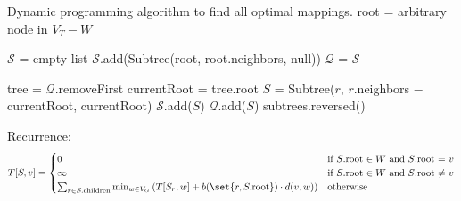 \documentclass[language=english, number=1]{../lib/homework}
\begin{document}
    \begin{algorithm}
        \label{alg:idk}
        \begin{algorithmic}[1]
            \Statex Dynamic programming algorithm to find all optimal mappings.
                \State root = arbitrary node in $V_T - W$

                \State $\mathcal S$ = empty list
                \State $\mathcal S$.add(Subtree(root, root.neighbors, null)) 
                \State $\mathcal Q$ = $\mathcal S$

                    \State tree = $\mathcal Q$.removeFirst
                    \State currentRoot = tree.root
                        \State $S$ = Subtree($r$, $r$.neighbors $-$ currentRoot, currentRoot)
                        \State $\mathcal S$.add($S$)
                        \State $\mathcal Q$.add($S$)
                    \EndFor
                \EndWhile
                \Return subtrees.reversed()
            \EndProcedure
        \end{algorithmic}
    \end{algorithm}

    Recurrence:
    \[
        T[S, v] = \begin{cases}
                      0 &\text{if $S$.root $\in W$ and $S$.root = $v$} \\
                      \infty &\text{if $S$.root $\in W$ and $S$.root $\neq$ $v$} \\
                      \sum_{r \in S.\text{children}} \min_{w \in V_G} \left( T[S_r, w] + b(\set{r, S.\text{root}}) \cdot d(v, w) \right) &\text{otherwise} \\
        \end{cases}
    \]
\end{document}
